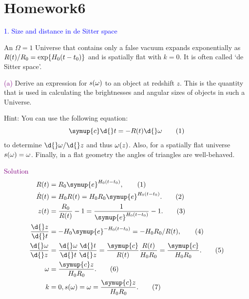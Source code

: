 \documentclass[UTF8, 12pt, a4paper, oneside, twocolumn, fontset=none]{ctexart}
\begin{document}
\section*{Homework6}

\hspace*{\fill}

\noindent\textcolor{blue}{1. Size and distance in de Sitter space}

\noindent An $\Omega=1$ Universe that contains only a false vacuum expands exponentially as $R\mleft(t\mright)/R_{0}=\exp\mleft\{H_{0}\mleft(t-t_{0}\mright)\mright\}$ and is spatially flat with $k=0$. It is often called `de Sitter space'.

\hspace*{\fill}

\noindent\textcolor{purple}{(a)} Derive an expression for $s\mleft(\omega\mright)$ to an object at redshift $z$. This is the quantity that is used in calculating the brightnesses and angular sizes of objects in such a Universe.

\noindent Hint: You can use the following equation:
\begin{equation}
\symup{c}\d{}t=-R\mleft(t\mright)\d{}\omega\tag{1}
\end{equation}
to determine $\d{}\omega/\d{}z$ and thus $\omega\mleft(z\mright)$. Also, for a spatially flat universe $s\mleft(\omega\mright)=\omega$. Finally, in a flat geometry the angles of triangles are well-behaved.

\hspace*{\fill}

\noindent\textcolor{purple}{Solution}
\begin{align}
R\mleft(t\mright)&=R_{0}\symup{e}^{H_{0}\mleft(t-t_{0}\mright)},\tag{1}\\
\dot{R}\mleft(t\mright)&=H_{0}R\mleft(t\mright)=H_{0}R_{0}\symup{e}^{H_{0}\mleft(t-t_{0}\mright)}.\tag{2}\\
z\mleft(t\mright)&=\frac{R_{0}}{R\mleft(t\mright)}-1=\frac{1}{\symup{e}^{H_{0}\mleft(t-t_{0}\mright)}}-1.\tag{3}\\
\frac{\d{}z}{\d{}t}&=-H_{0}\symup{e}^{-H_{0}\mleft(t-t_{0}\mright)}=-H_{0}R_{0}/R\mleft(t\mright),\tag{4}\\
\frac{\d{}\omega}{\d{}z}&=\frac{\d{}\omega}{\d{}t}\frac{\d{}t}{\d{}z}=\frac{\symup{c}}{R\mleft(t\mright)}\frac{R\mleft(t\mright)}{H_{0}R_{0}}=\frac{\symup{c}}{H_{0}R_{0}}.\tag{5}\\
\omega&=\frac{\symup{c}z}{H_{0}R_{0}}.\tag{6}\\
k&=0, s\mleft(\omega\mright)=\omega=\frac{\symup{c}z}{H_{0}R_{0}}.\tag{7}
\end{align}
\end{document}
